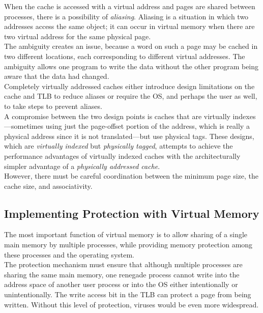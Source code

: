 \documentclass[12pt]{article}
\theoremstyle{definition}
\begin{document}
  When the cache is accessed with a virtual address and pages are shared between processes, there is a possibility of \emph{aliasing}.
  Aliasing is a situation in which two addresses access the same object;
  it can occur in virtual memory when there are two virtual address for the same physical page. \\
  The ambiguity creates an issue, because a word on such a page may be cached in two different locations, each corresponding to different virtual addresses.
  The ambiguity allows one program to write the data without the other program being aware that the data had changed. \\
  Completely virtually addressed caches either introduce design limitations on the cache and TLB to reduce aliases or require the OS, and perhaps the user as well, to take steps to prevent aliases. \\

  A compromise between the two design points is caches that are virtually indexes---sometimes using just the page-offset portion of the address, which is really a physical address since it is not translated---but use physical tags.
  These designs, which are \emph{virtually indexed} but \emph{physically tagged}, attempts to achieve the performance advantages of virtually indexed caches with the architecturally simpler advantage of a \emph{physically addressed cache}. \\
  However, there must be careful coordination between the minimum page size, the cache size, and associativity. \\

  \subsection{Implementing Protection with Virtual Memory}
  The most important function of virtual memory is to allow sharing of a single main memory by multiple processes, while providing memory protection among these processes and the operating system. \\
  The protection mechanism must ensure that although multiple processes are sharing the same main memory, one renegade process cannot write into the address space of another user process or into the OS either intentionally or unintentionally.
  The write access bit in the TLB can protect a page from being written.
  Without this level of protection, viruses would be even more widespread. \\
\end{document}
